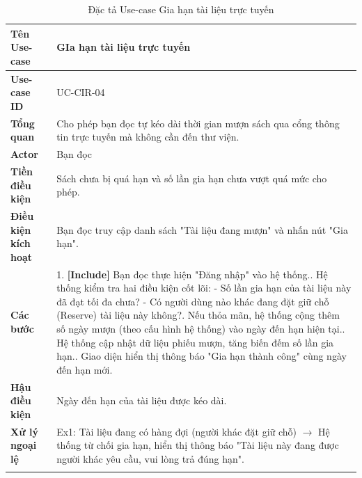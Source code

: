 \newpage
\begin{longtable}{|p{3.5cm}|p{11.5cm}|}
    \hline
    \textbf{Tên Use-case} & \textbf{GIa hạn tài liệu trực tuyến} \\
    \hline
    \textbf{Use-case ID} & UC-CIR-04 \\
    \hline
    \textbf{Tổng quan} & Cho phép bạn đọc tự kéo dài thời gian mượn sách qua cổng thông tin trực tuyến mà không cần đến thư viện. \\
    \hline
    \textbf{Actor} & Bạn đọc \\
    \hline
    \textbf{Tiền điều kiện} & Sách chưa bị quá hạn và số lần gia hạn chưa vượt quá mức cho phép. \\
    \hline
    \textbf{Điều kiện kích hoạt} & Bạn đọc truy cập danh sách "Tài liệu đang mượn" và nhấn nút "Gia hạn". \\
    \hline
    \textbf{Các bước} & 
    1. \textbf{[Include]} Bạn đọc thực hiện "Đăng nhập" vào hệ thống.\newline
    2. Hệ thống kiểm tra hai điều kiện cốt lõi:\newline
    - Số lần gia hạn của tài liệu này đã đạt tối đa chưa?\newline
    - Có người dùng nào khác đang đặt giữ chỗ (Reserve) tài liệu này không?\newline
    3. Nếu thỏa mãn, hệ thống cộng thêm số ngày mượn (theo cấu hình hệ thống) vào ngày đến hạn hiện tại.\newline
    4. Hệ thống cập nhật dữ liệu phiếu mượn, tăng biến đếm số lần gia hạn.\newline
    5. Giao diện hiển thị thông báo "Gia hạn thành công" cùng ngày đến hạn mới. \\
    \hline
    \textbf{Hậu điều kiện} & Ngày đến hạn của tài liệu được kéo dài. \\
    \hline
    \textbf{Xử lý ngoại lệ} & 
    Ex1: Tài liệu đang có hàng đợi (người khác đặt giữ chỗ) $\rightarrow$ Hệ thống từ chối gia hạn, hiển thị thông báo "Tài liệu này đang được người khác yêu cầu, vui lòng trả đúng hạn". \\
    \hline
    \caption{Đặc tả Use-case Gia hạn tài liệu trực tuyến}
\end{longtable}

